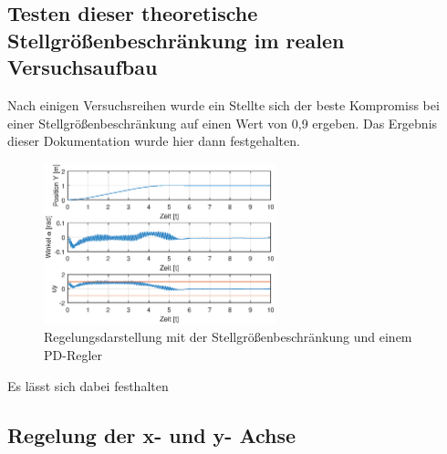\documentclass[10pt]{scrartcl}
\begin{document}
\subsection{Testen dieser theoretische Stellgrößenbeschränkung im realen Versuchsaufbau}
Nach einigen Versuchsreihen wurde ein Stellte sich der beste Kompromiss bei einer Stellgrößenbeschränkung auf einen Wert von 0,9 ergeben. Das Ergebnis dieser Dokumentation wurde hier dann festgehalten.

\begin{figure}[H]
	\centering
	\includegraphics[width=0.6\textwidth]{Figure45b5mitSaturation}
	\caption{Regelungsdarstellung mit der Stellgrößenbeschränkung und einem PD-Regler}
	\label{img:grafik-dummy}
\end{figure}

Es lässt sich dabei festhalten 
\subsection{Regelung der x- und y- Achse}

\end{document}
